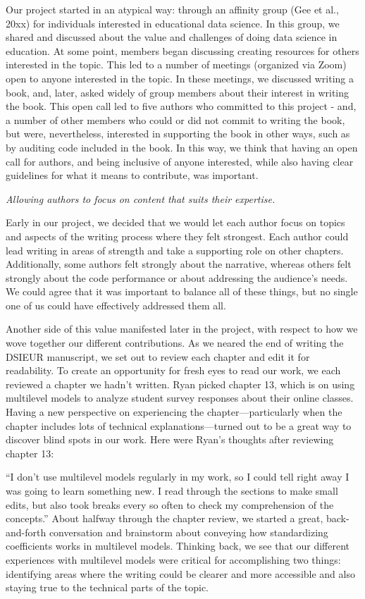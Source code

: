 \documentclass[
  english,
  man]{apa6}
\begin{document}
Our project started in an atypical way: through an affinity group (Gee et al., 20xx) for individuals interested in educational data science. In this group, we shared and discussed about the value and challenges of doing data science in education. At some point, members began discussing creating resources for others interested in the topic. This led to a number of meetings (organized via Zoom) open to anyone interested in the topic. In these meetings, we discussed writing a book, and, later, asked widely of group members about their interest in writing the book. This open call led to five authors who committed to this project - and, a number of other members who could or did not commit to writing the book, but were, nevertheless, interested in supporting the book in other ways, such as by auditing code included in the book. In this way, we think that having an open call for authors, and being inclusive of anyone interested, while also having clear guidelines for what it means to contribute, was important.

\emph{Allowing authors to focus on content that suits their expertise.}

Early in our project, we decided that we would let each author focus on topics and aspects of the writing process where they felt strongest. Each author could lead writing in areas of strength and take a supporting role on other chapters. Additionally, some authors felt strongly about the narrative, whereas others felt strongly about the code performance or about addressing the audience's needs. We could agree that it was important to balance all of these things, but no single one of us could have effectively addressed them all.

Another side of this value manifested later in the project, with respect to how we wove together our different contributions. As we neared the end of writing the DSIEUR manuscript, we set out to review each chapter and edit it for readability. To create an opportunity for fresh eyes to read our work, we each reviewed a chapter we hadn't written. Ryan picked chapter 13, which is on using multilevel models to analyze student survey responses about their online classes. Having a new perspective on experiencing the chapter---particularly when the chapter includes lots of technical explanations---turned out to be a great way to discover blind spots in our work. Here were Ryan's thoughts after reviewing chapter 13:

``I don't use multilevel models regularly in my work, so I could tell right away I was going to learn something new. I read through the sections to make small edits, but also took breaks every so often to check my comprehension of the concepts.''
About halfway through the chapter review, we started a great, back-and-forth conversation and brainstorm about conveying how standardizing coefficients works in multilevel models. Thinking back, we see that our different experiences with multilevel models were critical for accomplishing two things: identifying areas where the writing could be clearer and more accessible and also staying true to the technical parts of the topic.
\end{document}
